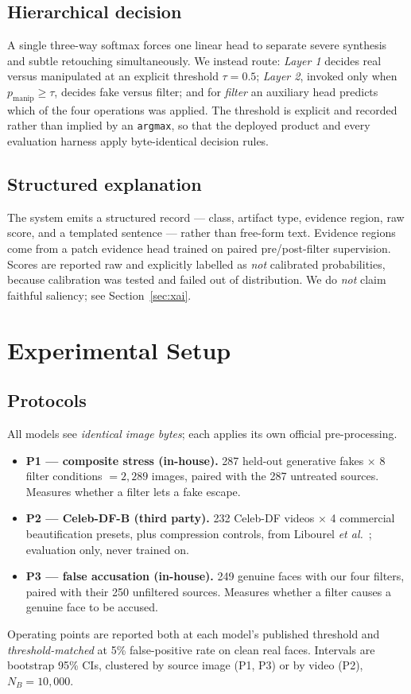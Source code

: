 \documentclass[conference]{IEEEtran}
\begin{document}
\subsection{Hierarchical decision}
A single three-way softmax forces one linear head to separate severe synthesis and subtle
retouching simultaneously. We instead route:
\emph{Layer 1} decides real versus manipulated at an explicit threshold
$\tau = 0.5$; \emph{Layer 2}, invoked only when $p_{\mathrm{manip}} \ge \tau$, decides fake
versus filter; and for \emph{filter} an auxiliary head predicts which of the four operations
was applied. The threshold is explicit and recorded rather than implied by an
\texttt{argmax}, so that the deployed product and every evaluation harness apply
byte-identical decision rules.

\subsection{Structured explanation}
The system emits a structured record --- class, artifact type, evidence region, raw score,
and a templated sentence --- rather than free-form text. Evidence regions come from a patch
evidence head trained on paired pre/post-filter supervision. Scores are reported raw and
explicitly labelled as \emph{not} calibrated probabilities, because calibration was tested
and failed out of distribution. We do \emph{not} claim faithful saliency; see
Section~\ref{sec:xai}.

\section{Experimental Setup}

\subsection{Protocols}
All models see \emph{identical image bytes}; each applies its own official pre-processing.
\begin{itemize}
\item \textbf{P1 --- composite stress (in-house).} 287 held-out generative fakes
      $\times$ 8 filter conditions $=2{,}289$ images, paired with the 287 untreated sources.
      Measures whether a filter lets a fake escape.
\item \textbf{P2 --- Celeb-DF-B (third party).} 232 Celeb-DF videos $\times$ 4 commercial
      beautification presets, plus compression controls, from Libourel
      \emph{et al.}~\cite{libourel2024}; evaluation only, never trained on.
\item \textbf{P3 --- false accusation (in-house).} 249 genuine faces with our four filters,
      paired with their 250 unfiltered sources. Measures whether a filter causes a genuine
      face to be accused.
\end{itemize}
Operating points are reported both at each model's published threshold and
\emph{threshold-matched} at 5\% false-positive rate on clean real faces. Intervals are
bootstrap 95\% CIs, clustered by source image (P1, P3) or by video (P2), $N_B=10{,}000$.
\end{document}
